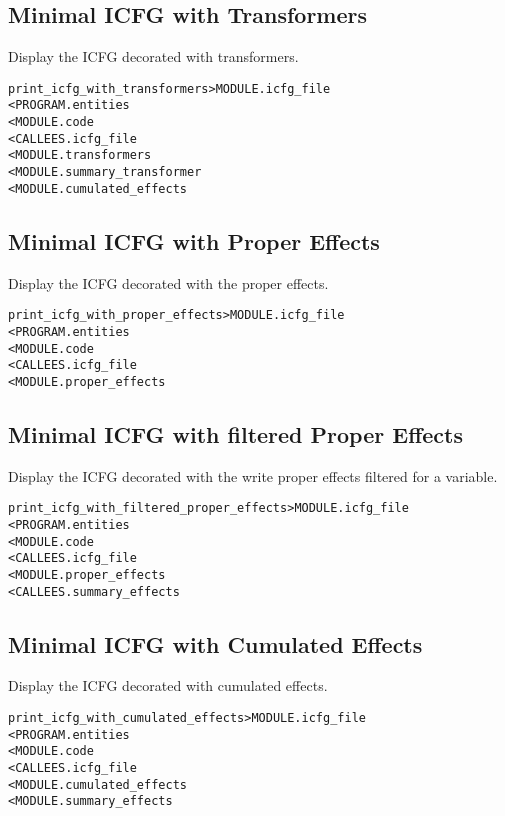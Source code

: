 \documentclass[a4paper]{report}
\newenvironment{PipsMake}{\begin{alltt}}{\end{alltt}}
\begin{document}
\subsection{Minimal ICFG with Transformers}

Display the ICFG decorated with transformers.
\begin{PipsMake}
print_icfg_with_transformers             > MODULE.icfg_file
        < PROGRAM.entities
        < MODULE.code
        < CALLEES.icfg_file
        < MODULE.transformers
        < MODULE.summary_transformer
        < MODULE.cumulated_effects
\end{PipsMake}

\subsection{Minimal ICFG with Proper Effects}

Display the ICFG decorated with the proper effects.
\begin{PipsMake}
print_icfg_with_proper_effects           > MODULE.icfg_file
        < PROGRAM.entities
        < MODULE.code
        < CALLEES.icfg_file
        < MODULE.proper_effects
\end{PipsMake}

\subsection{Minimal ICFG with filtered Proper Effects}
Display the ICFG decorated with the write proper effects filtered for a variable.
\begin{PipsMake}
print_icfg_with_filtered_proper_effects           > MODULE.icfg_file
        < PROGRAM.entities
        < MODULE.code
        < CALLEES.icfg_file
        < MODULE.proper_effects
        < CALLEES.summary_effects
\end{PipsMake}

\subsection{Minimal ICFG with Cumulated Effects}

Display the ICFG decorated with cumulated effects.
\begin{PipsMake}
print_icfg_with_cumulated_effects        > MODULE.icfg_file
        < PROGRAM.entities
        < MODULE.code
        < CALLEES.icfg_file
        < MODULE.cumulated_effects
        < MODULE.summary_effects
\end{PipsMake}
\end{document}
